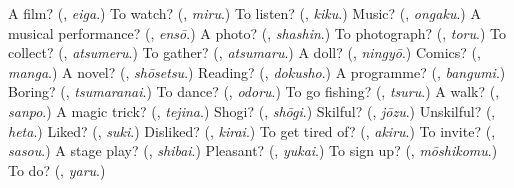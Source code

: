 \begin{tcolorbox}[breakable,colback=teal!4,colframe=teal!35!black,title={Before you move on}]
A film? (\textbf{}, \emph{eiga}.) To watch? (\textbf{}, \emph{miru}.) To listen? (\textbf{}, \emph{kiku}.) Music? (\textbf{}, \emph{ongaku}.) A musical performance? (\textbf{}, \emph{ensō}.) A photo? (\textbf{}, \emph{shashin}.) To photograph? (\textbf{}, \emph{toru}.) To collect? (\textbf{}, \emph{atsumeru}.) To gather? (\textbf{}, \emph{atsumaru}.) A doll? (\textbf{}, \emph{ningyō}.) Comics? (\textbf{}, \emph{manga}.) A novel? (\textbf{}, \emph{shōsetsu}.) Reading? (\textbf{}, \emph{dokusho}.) A programme? (\textbf{}, \emph{bangumi}.) Boring? (\textbf{}, \emph{tsumaranai}.) To dance? (\textbf{}, \emph{odoru}.) To go fishing? (\textbf{}, \emph{tsuru}.) A walk? (\textbf{}, \emph{sanpo}.) A magic trick? (\textbf{}, \emph{tejina}.) Shogi? (\textbf{}, \emph{shōgi}.) Skilful? (\textbf{}, \emph{jōzu}.) Unskilful? (\textbf{}, \emph{heta}.) Liked? (\textbf{}, \emph{suki}.) Disliked? (\textbf{}, \emph{kirai}.) To get tired of? (\textbf{}, \emph{akiru}.) To invite? (\textbf{}, \emph{sasou}.) A stage play? (\textbf{}, \emph{shibai}.) Pleasant? (\textbf{}, \emph{yukai}.) To sign up? (\textbf{}, \emph{mōshikomu}.) To do? (\textbf{}, \emph{yaru}.)
\end{tcolorbox}
